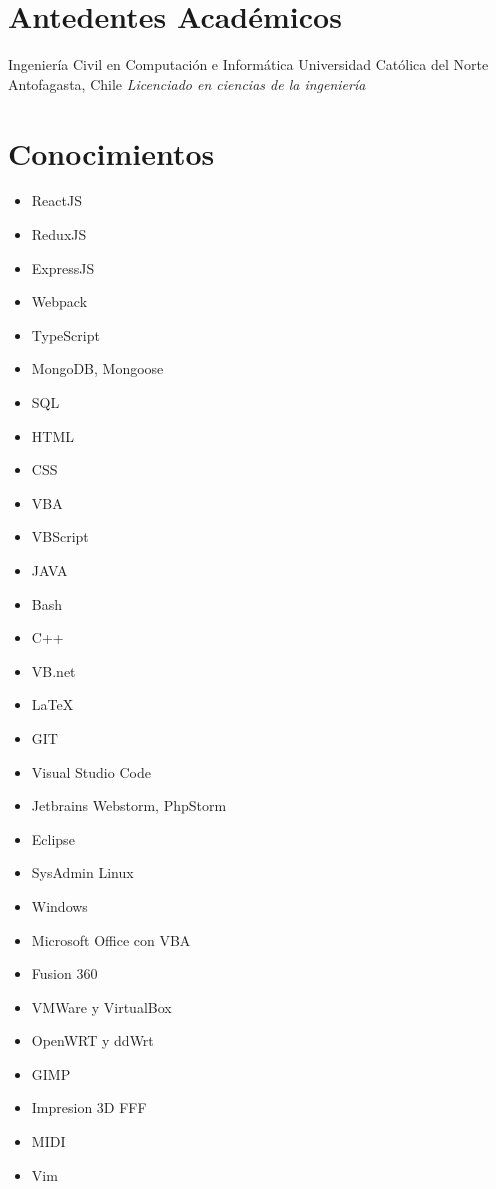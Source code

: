 \documentclass[draft,color,12pt,letterpaper,sans]{moderncv}
\begin{document}
\section{Antedentes Académicos}
{Ingeniería Civil en Computación e Informática}
{Universidad Católica del Norte}
{Antofagasta, Chile}
{\textit{Licenciado en ciencias de la ingeniería}}
{}


\section{Conocimientos}
\begin{cvcolumns}
	{
		\begin{itemize}
			\item
				ReactJS
			\item
				ReduxJS
			\item
				ExpressJS
			\item
				Webpack
			\item
				TypeScript
			\item
				MongoDB, Mongoose
			\item
				SQL
			\item
				HTML
			\item
				CSS
			\item
				VBA
			\item	
				VBScript
			\item
				JAVA		
			\item
				Bash
			\item
				C++
			\item
				VB.net
			\item
				LaTeX
		\end{itemize}
	}
	

{
	\begin{itemize}
		\item
			GIT
		\item
			Visual Studio Code
		\item
			Jetbrains Webstorm, PhpStorm
		\item
			Eclipse
		\item
			SysAdmin Linux
		\item
			Windows
		\item
			Microsoft Office con VBA
		\item
			Fusion 360
		\item
			VMWare y VirtualBox
		\item
			OpenWRT y ddWrt
		\item
			GIMP
		\item
			Impresion 3D FFF
		\item
			MIDI
		\item	
			Vim
	\end{itemize}
}

\end{cvcolumns}
\end{document}
